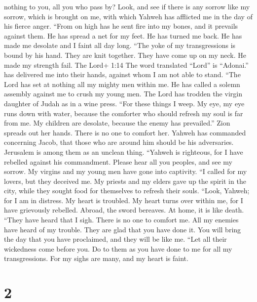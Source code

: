 nothing to you, all you who pass by? Look, and see if there is any
sorrow like my sorrow, which is brought on me, with which Yahweh has
afflicted me in the day of his fierce anger.  ``From on
high has he sent fire into my bones, and it prevails against them. He
has spread a net for my feet. He has turned me back. He has made me
desolate and I faint all day long.  ``The yoke of my
transgressions is bound by his hand. They are knit together. They have
come up on my neck. He made my strength fail. The Lord+ 1:14 The word
translated ``Lord'' is ``Adonai.'' has delivered me into their hands,
against whom I am not able to stand.  ``The Lord has set at
nothing all my mighty men within me. He has called a solemn assembly
against me to crush my young men. The Lord has trodden the virgin
daughter of Judah as in a wine press.  ``For these things I
weep. My eye, my eye runs down with water, because the comforter who
should refresh my soul is far from me. My children are desolate, because
the enemy has prevailed.''  Zion spreads out her hands.
There is no one to comfort her. Yahweh has commanded concerning Jacob,
that those who are around him should be his adversaries. Jerusalem is
among them as an unclean thing.  ``Yahweh is righteous, for
I have rebelled against his commandment. Please hear all you peoples,
and see my sorrow. My virgins and my young men have gone into captivity.
 ``I called for my lovers, but they deceived me. My priests
and my elders gave up the spirit in the city, while they sought food for
themselves to refresh their souls.  ``Look, Yahweh; for I
am in distress. My heart is troubled. My heart turns over within me, for
I have grievously rebelled. Abroad, the sword bereaves. At home, it is
like death.  ``They have heard that I sigh. There is no one
to comfort me. All my enemies have heard of my trouble. They are glad
that you have done it. You will bring the day that you have proclaimed,
and they will be like me.  ``Let all their wickedness come
before you. Do to them as you have done to me for all my transgressions.
For my sighs are many, and my heart is faint.

\hypertarget{section-1}{%
\section{2}\label{section-1}}

